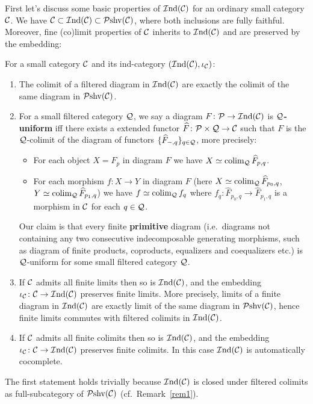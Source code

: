 \documentclass[twoside]{article}
\begin{document}


First let's discuss some basic properties of $\mathcal{I}\mathrm{nd}({\mathcal{C}})$ for an ordinary small category ${\mathcal{C}}$. We have ${\mathcal{C}} \subset \mathcal{I}\mathrm{nd}({\mathcal{C}}) \subset \mathcal{P}\mathrm{shv}({\mathcal{C}})$, where both inclusions are fully faithful. Moreover, fine (co)limit properties of ${\mathcal{C}}$ inherits to $\mathcal{I}\mathrm{nd}({\mathcal{C}})$ and are preserved by the embedding:
\begin{fact}\label{fact1} For a small category ${\mathcal{C}}$ and its ind-category $(\mathcal{I}\mathrm{nd}({\mathcal{C}}), \iota_{\mathcal{C}})$:
\begin{enumerate}[format=\textup]
\item The colimit of a filtered diagram in $\mathcal{I}\mathrm{nd}({\mathcal{C}})$ are exactly the colimit of the same diagram in $\mathcal{P}\mathrm{shv}({\mathcal{C}})$.
\item For a small filtered category ${\mathcal{Q}}$, we say a diagram $F\colon {\mathcal{P}} \rightarrow \mathcal{I}\mathrm{nd}({\mathcal{C}})$ is \textbf{${\mathcal{Q}}$-uniform} iff there exists a extended functor $\widehat{F}\colon {\mathcal{P}} \times {\mathcal{Q}} \rightarrow {\mathcal{C}}$ such that $F$ is the ${\mathcal{Q}}$-colimit of the diagram of functors $\{\widehat{F}_{-,q}\}_{q \in {\mathcal{Q}}}$, more precisely:
\begin{itemize}
\item For each object $X = F_p$ in diagram $F$ we have $X \simeq \operatorname*{\mathrm{colim}}_{\mathcal{Q}} \widehat{F}_{p,q}$.
\item For each morphism $f\colon X \rightarrow Y$ in diagram $F$ (here $X \simeq \operatorname*{\mathrm{colim}}_{\mathcal{Q}} \widehat{F}_{p_0, q}$,  $Y \simeq \operatorname*{\mathrm{colim}}_{\mathcal{Q}} \widehat{F}_{p_1, q}$) we have $f \simeq \operatorname*{\mathrm{colim}}_{\mathcal{Q}} f_q$ where $f_q\colon \widehat{F}_{p_0,q} \rightarrow \widehat{F}_{p_1,q}$ is a morphism in ${\mathcal{C}}$ for each $q \in {\mathcal{Q}}$.
\end{itemize}  
Our claim is that every finite \textbf{primitive} diagram (i.e.\ diagrams not containing any two consecutive indecomposable generating morphisms, such as diagram of finite products, coproducts, equalizers and coequalizers etc.) is ${\mathcal{Q}}$-uniform for some small filtered category ${\mathcal{Q}}$.
\item If ${\mathcal{C}}$ admits all finite limits then so is $\mathcal{I}\mathrm{nd}({\mathcal{C}})$, and the embedding $\iota_{\mathcal{C}}\colon {\mathcal{C}} \rightarrow \mathcal{I}\mathrm{nd}({\mathcal{C}})$ preserves finite limits. More precisely, limits of a finite diagram in $\mathcal{I}\mathrm{nd}({\mathcal{C}})$ are exactly limit of the same diagram in $\mathcal{P}\mathrm{shv}({\mathcal{C}})$, hence finite limits commutes with filtered colimits in $\mathcal{I}\mathrm{nd}({\mathcal{C}})$.
\item If ${\mathcal{C}}$ admits all finite colimits then so is $\mathcal{I}\mathrm{nd}({\mathcal{C}})$, and the embedding $\iota_{\mathcal{C}}\colon {\mathcal{C}} \rightarrow \mathcal{I}\mathrm{nd}({\mathcal{C}})$ preserves finite colimits. In this case $\mathcal{I}\mathrm{nd}({\mathcal{C}})$ is automatically cocomplete.
\end{enumerate}
\end{fact}
The first statement holds trivially because $\mathcal{I}\mathrm{nd}({\mathcal{C}})$ is closed under filtered colimits as full-subcategory of $\mathcal{P}\mathrm{shv}({\mathcal{C}})$ (cf.\ Remark~\ref{rem1}).\\
\end{document}
